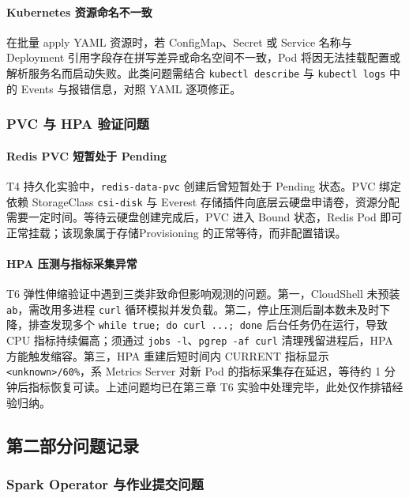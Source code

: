 \paragraph{Kubernetes 资源命名不一致}

在批量 apply YAML 资源时，若 ConfigMap、Secret 或 Service 名称与 Deployment 引用字段存在拼写差异或命名空间不一致，Pod 将因无法挂载配置或解析服务名而启动失败。此类问题需结合 \verb|kubectl describe| 与 \verb|kubectl logs| 中的 Events 与报错信息，对照 YAML 逐项修正。

\subsubsection{PVC 与 HPA 验证问题}

\paragraph{Redis PVC 短暂处于 Pending}

T4 持久化实验中，\verb|redis-data-pvc| 创建后曾短暂处于 Pending 状态。PVC 绑定依赖 StorageClass \verb|csi-disk| 与 Everest 存储插件向底层云硬盘申请卷，资源分配需要一定时间。等待云硬盘创建完成后，PVC 进入 Bound 状态，Redis Pod 即可正常挂载；该现象属于存储Provisioning 的正常等待，而非配置错误。

\paragraph{HPA 压测与指标采集异常}

T6 弹性伸缩验证中遇到三类非致命但影响观测的问题。第一，CloudShell 未预装 \verb|ab|，需改用多进程 \verb|curl| 循环模拟并发负载。第二，停止压测后副本数未及时下降，排查发现多个 \verb|while true; do curl ...; done| 后台任务仍在运行，导致 CPU 指标持续偏高；须通过 \verb|jobs -l|、\verb|pgrep -af curl| 清理残留进程后，HPA 方能触发缩容。第三，HPA 重建后短时间内 CURRENT 指标显示 \verb|<unknown>/60%|，系 Metrics Server 对新 Pod 的指标采集存在延迟，等待约 1 分钟后指标恢复可读。上述问题均已在第三章 T6 实验中处理完毕，此处仅作排错经验归纳。

\subsection{第二部分问题记录}

\subsubsection{Spark Operator 与作业提交问题}

